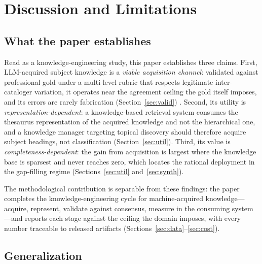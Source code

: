 
\section{Discussion and Limitations}
\label{sec:disc}

\subsection{What the paper establishes}

Read as a knowledge-engineering study, this paper establishes three
claims. First, LLM-acquired subject knowledge is a \emph{viable
acquisition channel}: validated against professional gold under a
multi-level rubric that respects legitimate inter-cataloger variation, it
operates near the agreement ceiling the gold itself imposes, and its errors
are rarely fabrication (Section~\ref{sec:valid}) . Second, its utility is \emph{representation-dependent}: a
knowledge-based retrieval system consumes the thesaurus representation of
the acquired knowledge and not the hierarchical one, and a knowledge
manager targeting topical discovery should therefore acquire subject
headings, not classification (Section~\ref{sec:util}). Third, its value is
\emph{completeness-dependent}: the gain from acquisition is largest where
the knowledge base is sparsest and never reaches zero, which locates the
rational deployment in the gap-filling regime (Sections~\ref{sec:util}
and~\ref{sec:synth}).

The methodological contribution is separable from these findings: the
paper completes the knowledge-engineering cycle for machine-acquired
knowledge---acquire, represent, validate against consensus, measure in the
consuming system---and reports each stage against the ceiling the domain
imposes, with every number traceable to released artifacts
(Sections~\ref{sec:data}--\ref{sec:cost}).

\subsection{Generalization}

